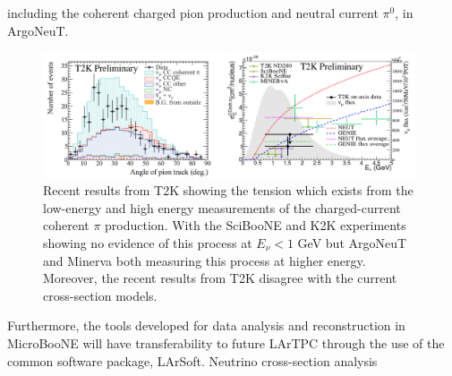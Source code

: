 including the coherent charged pion production and neutral current $\pi^{0}$,  in ArgoNeuT.

\begin{figure}[htb]
\centering
\includegraphics[width=0.98\textwidth]{images/CCCohPion.png}
\caption[]{Recent results from T2K \cite{} showing the tension which exists from the low-energy and high energy measurements of the charged-current coherent $\pi$ production. With the SciBooNE and K2K experiments showing no evidence of this process at $E_{\nu} < 1$ GeV but ArgoNeuT and Minerva both measuring this process at higher energy. Moreover, the recent results from T2K disagree with the current cross-section models.}
\label{fig:ubooneEvents}
\end{figure}


Furthermore, the tools developed for data analysis and reconstruction in MicroBooNE will have transferability to future LArTPC through the use of the common software package, LArSoft.
Neutrino cross-section analysis
